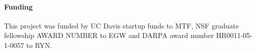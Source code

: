 \documentclass{bioinfo}
\begin{document}
\paragraph{Funding\textcolon} 

This project was funded by UC Davis startup funds to MTF, NSF graduate
fellowship AWARD NUMBER to EGW and DARPA award number HR0011-05-1-0057
to RYN.

%
%
%
%
%




\end{document}
